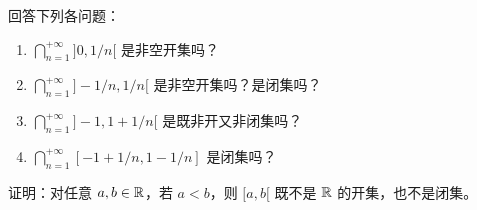 \begin{exercise}
  \item 回答下列各问题：
  \begin{enumerate}[label=\arabic*)]
    \item \(\displaystyle\bigcap_{n=1}^{+\infty}]0,1/n[\) 是非空开集吗？
    \item \(\displaystyle\bigcap_{n=1}^{+\infty}]-1/n,1/n[\) 是非空开集吗？是闭集吗？
    \item \(\displaystyle\bigcap_{n=1}^{+\infty}]-1,1+1/n[\) 是既非开又非闭集吗？
    \item \(\displaystyle\bigcap_{n=1}^{+\infty}[-1+1/n,1-1/n]\) 是闭集吗？
  \end{enumerate}
\end{exercise}

\begin{exercise}
  \item 证明：对任意 \(a,b\in\mathbb{R}\)，若 \(a<b\)，则 \([a,b[\) 既不是
  \(\mathbb{R}\) 的开集，也不是闭集。
\end{exercise}
